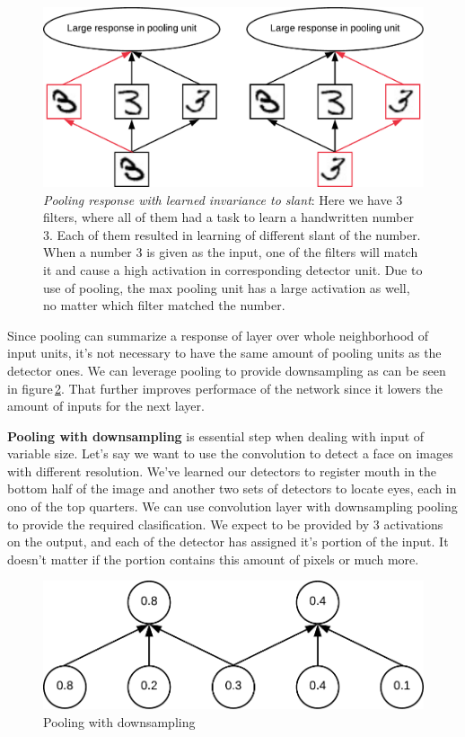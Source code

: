 \begin{figure}
    \centering
    \includegraphics[width=.8\textwidth]{obrazky-figures/pooling.pdf}
    \caption{\textit{Pooling response with learned invariance to slant}: Here we have 3 filters, where all of them had a task to learn a handwritten number 3. Each of them resulted in learning of different slant of the number. When a number 3 is given as the input, one of the filters will match it and cause a high activation in corresponding detector unit. Due to use of pooling, the max pooling unit has a large activation as well, no matter which filter matched the number.}\label{fig:pooling}
\end{figure}

Since pooling can summarize a response of layer over whole neighborhood of input units, it's not necessary to have the same amount of pooling units as the detector ones. We can leverage pooling to provide downsampling as can be seen in figure\,\ref{fig:downsample}. That further improves performace of the network since it lowers the amount of inputs for the next layer.

\textbf{Pooling with downsampling} is essential step when dealing with input of variable size. Let's say we want to use the convolution to detect a face on images with different resolution. We've learned our detectors to register mouth in the bottom half of the image and another two sets of detectors to locate eyes, each in ono of the top quarters. We can use convolution layer with downsampling pooling to provide the required clasification. We expect to be provided by 3 activations on the output, and each of the detector has assigned it's portion of the input. It doesn't matter if the portion contains this amount of pixels or much more.

\begin{figure}
    \centering
    \includegraphics[width=.6\textwidth]{obrazky-figures/downsampling.pdf}
    \caption{Pooling with downsampling}\label{fig:downsample}
\end{figure}

